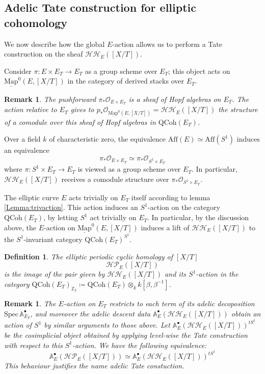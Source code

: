 \documentclass[11pt,letterpaper]{amsart}
\newtheorem{definition}[dummy]{Definition}
\newtheorem{remark}[dummy]{Remark}
\newcommand{\bA}{\mathbb{A}}
\newcommand{\bZ}{\mathbb{Z}}
\newcommand{\cO}{\mathcal{O}}
\newcommand{\cHH}{\mathcal{HH}}
\newcommand{\cHP}{\mathcal{HP}}
\newcommand{\Mapo}[2]{\underline{\mathrm{Map}}^{0}\left (#1,#2\right )}
\newcommand{\Aff}[1]{\mathrm{Aff}(#1)}
\newcommand{\Spec}{\mathrm{S}\mathrm{pec}\,}
\newcommand{\QCoh}{\mathrm{QCoh}}
\begin{document}
\subsection{Adelic Tate construction for elliptic cohomology}
We now describe how the global $E$-action allows us to perform a Tate construction on the sheaf $\cHH_{E}([X/T])$. 

Consider $\pi:E\times E_T\to E_T$ as a group scheme over $E_T$; this object acts on $\Mapo{E}{[X/T]}$ in the category of derived stacks over $E_T$. 
\begin{remark}
The pushforward  $\pi_{\ast}\cO_{E\times E_T}$ is a sheaf of Hopf algebras on $E_T$. The action relative to $E_T$ gives to $p_{\ast}\cO_{\Mapo{E}{[X/T]}}=\cHH_{E}([X/T])$ the structure of a comodule over this sheaf of Hopf algebras in $\QCoh(E_T)$.
\end{remark}
Over a field $k$ of characteristic zero, the equivalence $\Aff{E}\simeq\Aff{S^1}$ induces an equivalence 
$$\pi_{\ast}\cO_{E\times E_T}\simeq\pi_{\ast}\cO_{S^1\times E_T}$$
where $\pi:S^1\times E_T\to E_T$ is viewed as a group scheme over $E_T$. In particular, $\cHH_{E}([X/T])$ receives a comodule structure over $\pi_{\ast}\cO_{S^1\times E_T}$.

The elliptic curve $E$ acts trivially on $E_T$ itself according to lemma \ref{Lemma:trivaction}. This action induces an $S^1$-action on the category $\QCoh(E_T)$, by letting $S^1$ act trivially on $E_T$. In particular, by the discussion above, the $E$-action on $\Mapo{E}{[X/T]}$ induces a lift of $\cHH_{E}([X/T])$ to the $S^1$-invariant category $\QCoh(E_T)^{S^1}$. 

\begin{definition}
The \emph{elliptic periodic cyclic homology} of $[X/T]$
$$\cHP_{E}([X/T])$$
is the image of the pair given by $\cHH_{E}([X/T])$ and its $S^1$-action in the category $\QCoh(E_T)_{\bZ_2}\coloneqq\QCoh(E_T)\otimes_{k}k[\beta,\beta^{-1}]$.
\end{definition}

\begin{remark}
The $E$-action on $E_T$ restricts to each term of its adelic decoposition $\Spec\bA_{E_T}^\bullet$, and moreover the adelic descent data $\bA_{E}^{\bullet}(\cHH_{E}([X/T]))$ obtain an action of $S^1$ by similar arguments to those above. 
Let $\bA_{E}^{\bullet}(\cHH_{E}([X/T]))^{tS^1}$ be the cosimplicial object obtained by applying level-wise the Tate construction with respect to this $S^1$-action. We have the following equivalence:
$$\bA_{E}^{\bullet}(\cHP_{E}([X/T]))\simeq\bA_{E}^{\bullet}(\cHH_{E}([X/T]))^{tS^1}$$
This behaviour justifies the name \emph{adelic} Tate constuction.
\end{remark}
\end{document}
